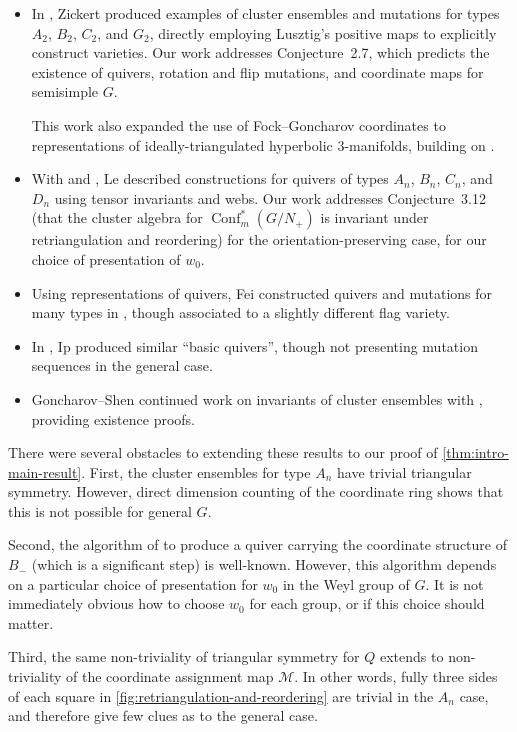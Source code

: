 \documentclass{amsart}
\theoremstyle{plain}
\theoremstyle{definition}
\theoremstyle{remark}
\newcommand{\conftoquiv}{\mathcal{M}}
\DeclareMathOperator{\Conf}{Conf}
\begin{document}
  \begin{itemize}
  \item
    In \cite{zickert2016}, Zickert produced examples of cluster
    ensembles and mutations for types $A_2$, $B_2$, $C_2$, and $G_2$,
    directly employing Lusztig's positive maps to explicitly construct
    varieties. Our work addresses Conjecture~2.7, which predicts the
    existence of quivers, rotation and flip mutations, and coordinate
    maps for semisimple $G$.

    This work also expanded the use of Fock--Goncharov coordinates to
    representations of ideally-triangulated hyperbolic $3$-manifolds,
    building on \cite{gtz2015}.
  \item
    With \cite{le2016} and \cite{le2016_2}, Le described constructions
    for quivers of types $A_n$, $B_n$, $C_n$, and $D_n$ using tensor
    invariants and webs. Our work addresses Conjecture~3.12 (that the
    cluster algebra for $\Conf_m^{\ast}(G/N_{+})$ is invariant under
    retriangulation and reordering) for the orientation-preserving case,
    for our choice of presentation of $w_0$.
  \item
    Using representations of quivers, Fei constructed quivers and
    mutations for many types in \cite{fei2016}, though associated to a
    slightly different flag variety.
  \item
    In \cite{ip2016}, Ip produced similar ``basic quivers'', though not
    presenting mutation sequences in the general case.
  \item
    Goncharov--Shen continued work on invariants of cluster ensembles
    with \cite{goncharovshen2018}, providing existence proofs.
  \end{itemize}

  There were several obstacles to extending these results to our proof
  of \cref{thm:intro-main-result}. First, the cluster ensembles for type
  $A_n$ have trivial triangular symmetry. However, direct dimension
  counting of the coordinate ring shows that this is not possible for
  general $G$.

  Second, the algorithm of \cite[Section~2]{fominzelevinsky2005} to
  produce a quiver carrying the coordinate structure of $B_{-}$ (which
  is a significant step) is well-known. However, this algorithm depends
  on a particular choice of presentation for $w_0$ in the Weyl group of
  $G$. It is not immediately obvious how to choose $w_0$ for each group,
  or if this choice should matter.

  Third, the same non-triviality of triangular symmetry for $Q$ extends
  to non-triviality of the coordinate assignment map $\conftoquiv$. In
  other words, fully three sides of each square in
  \cref{fig:retriangulation-and-reordering} are trivial in the $A_n$
  case, and therefore give few clues as to the general case.
\end{document}
